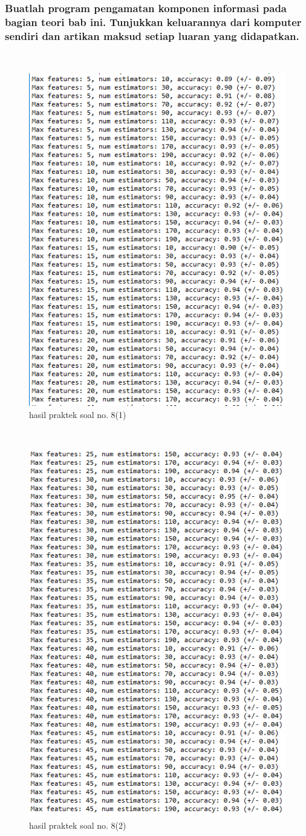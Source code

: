 \subsubsection{Buatlah program pengamatan komponen informasi pada bagian teori bab ini. Tunjukkan keluarannya dari komputer sendiri dan artikan maksud setiap luaran yang didapatkan.}
\hfill\\

	\begin{figure}[H]
	\centering
		\includegraphics[width=8 cm]{figures/1174067/4/17.png}
	\caption{hasil praktek soal no. 8(1)}
	\end{figure}
	\hfill\\
	\begin{figure}[H]
	\centering
		\includegraphics[width=8 cm]{figures/1174067/4/18.png}
	\caption{hasil praktek soal no. 8(2)}
	\end{figure}
	

